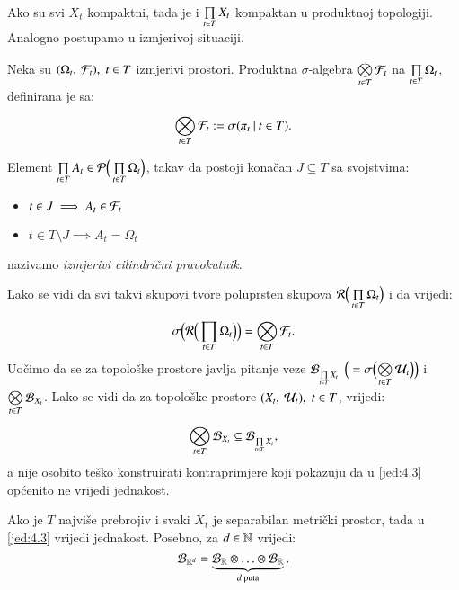 Ako su svi $X_t$ kompaktni, tada je i $\prod\limits_{t \in T}^{} X_t$ kompaktan u produktnoj topologiji.
Analogno postupamo u izmjerivoj situaciji.

\begin{defn}    \label{defn:4.0-4}
    Neka su $(\Omega_t, \: \mathcal{F}_t), \; t \in T$ izmjerivi prostori.
    Produktna $\sigma$-algebra $\bigotimes\limits_{t \in T}^{} \mathcal{F}_t$ na $\prod\limits_{t \in T}^{} \Omega_t$, definirana je sa:
    \begin{equation}    \label{jed:4.1}
        \bigotimes\limits_{t \in T}^{} \mathcal{F}_t := \sigma({\pi_t} \: | \: {t \in T}).
    \end{equation}
\end{defn}

\begin{defn}    \label{defn:4.0-5}
    Element $\prod\limits_{t \in T}^{} A_t \in \mathcal{P} \Big( \prod\limits_{t \in T}^{} \Omega_t \Big)$, takav da postoji kona\v can $J \subseteq T$ sa svojstvima:
    \begin{itemize}[label=]
        \item $t \in J \implies A_t \in \mathcal{F}_t$
        \item $ t \in T \setminus J \implies A_t = \Omega_t $
    \end{itemize}
    nazivamo \emph{izmjerivi cilindri\v cni pravokutnik}.
\end{defn}

Lako se vidi da svi takvi skupovi tvore poluprsten skupova $\mathcal{R} \Big( \prod\limits_{t \in T}^{} \Omega_t \Big)$ i da vrijedi:
\begin{equation}    \label{jed:4.2}
    \sigma \Big( {\mathcal{R} \Big( \prod\limits_{t \in T}^{} \Omega_t} \Big) \Big) = \bigotimes\limits_{t \in T}^{} \mathcal{F}_t.
\end{equation}
Uo\v cimo da se za topolo\v ske prostore javlja pitanje veze $\mathcal{B}_{\prod\limits_{t \in T}^{} X_t}$ $\Big(= \sigma \Big( {\bigotimes\limits_{t \in T}^{} \mathcal{U}_t} \Big) \Big)$ i $\bigotimes\limits_{t \in T}^{} \mathcal{B}_{X_t}$.
Lako se vidi da za topolo\v ske prostore $(X_t, \: \mathcal{U}_t), \; t \in T$, vrijedi:
\begin{equation}    \label{jed:4.3}
    \bigotimes\limits_{t \in T}^{} \mathcal{B}_{X_t} \subseteq \mathcal{B}_{\prod\limits_{t \in T}^{} X_t},
\end{equation}
a nije osobito te\v sko konstruirati kontraprimjere koji pokazuju da u \eqref{jed:4.3} op\' cenito ne vrijedi jednakost.

\begin{zad} \label{zad:4.4}
    Ako je $T$ najvi\v se prebrojiv i svaki $X_t$ je separabilan metri\v cki prostor, tada u \eqref{jed:4.3} vrijedi jednakost.
    Posebno, za $d \in \mathbb{N}$ vrijedi:
    \begin{equation}    \label{jed:4.5}
        \mathcal{B}_{\mathbb{R}^d} = \underbrace{\mathcal{B}_{\mathbb{R}} \otimes \ldots \otimes \mathcal{B}_{\mathbb{R}}}_{d \textnormal{ puta}}.
    \end{equation}
\end{zad}

